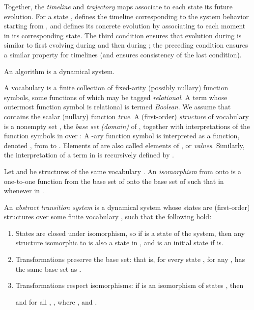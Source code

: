 \documentclass[envcountsame]{llncs}
\begin{document}
Together, the \emph{timeline} and \emph{trajectory} maps associate to each state its future
evolution. For a state ,  defines the timeline corresponding to the system behavior
starting from , and  defines its concrete evolution by associating to each moment in
 its corresponding state. The third condition ensures that evolution during  is similar to
first evolving during  and then during ; the preceding condition ensures a similar
property for timelines (and ensures  consistency of the last condition).

\begin{postulatep} An algorithm is a dynamical system.
\end{postulatep}





A vocabulary  is a finite collection of fixed-arity (possibly
nullary)  function
symbols,
 some functions of which may be tagged \emph{relational}.  A term whose
 outermost function symbol is relational is termed \emph{Boolean}. We
 assume that  contains the scalar (nullary) function \textit{true}.
A (first-order) \emph{structure}  of vocabulary  is a nonempty set , the
\emph{base set (domain)} of , together with interpretations of the function
symbols in  over : A -ary function  symbol  is interpreted as a function,
denoted  , from  to .  Elements of  are also called elements of
, or \emph{values}. Similarly, the interpretation of a term  in 
is recursively defined by .

Let  and  be structures of the same vocabulary . An
\emph{isomorphism} from  onto  is a one-to-one function 
from the base set of  onto the base set of  such that  in  whenever 
in .


\begin{definition}\label{ATS}
An \emph{abstract transition system} is a dynamical system
whose states  are (first-order) structures over some finite vocabulary ,
such that the following hold:
\begin{enumerate}
\item States are closed under isomorphism, so if  is a state of the system, then any structure  isomorphic to  is also a state in , and  is an initial state if  is.
\item Transformations preserve the base set: that is, for every state , for any ,  has the same base set as .




\item Transformations respect isomorphisms:   if 
  is an isomorphism of states ,  then

   and for all , ,
    where , and .


\end{enumerate}
\end{definition}
\end{document}
